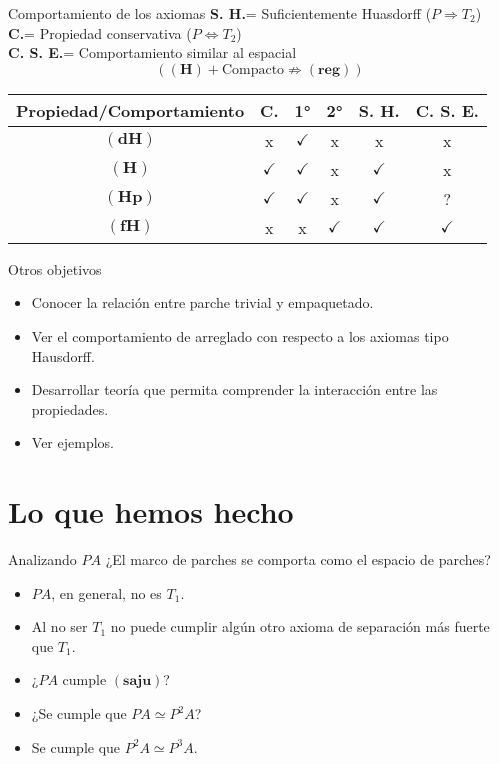 \documentclass[compress,12pt]{beamer}
\begin{document}
\begin{frame}{Comportamiento de los axiomas}
\textbf{S. H.}= Suficientemente Huasdorff ($P\Rightarrow T_2$)\\
\textbf{C.}= Propiedad conservativa ($P\Leftrightarrow T_2$)\\
\textbf{C. S. E.}= Comportamiento similar al espacial
\[
(\mathbf{(H)}+\mbox{Compacto}\nRightarrow \mathbf{(reg)})
\]
\begin{center}
\begin{tabular}{| c | c | c | c | c | c |}
\hline
 Propiedad/Comportamiento & \textbf{C.} & 1° & 2° & \textbf{S. H.} & \textbf{C. S. E.}\\ \hline
$\mathbf{(dH)}$ & x & $\checkmark$ & x & x & x \\ \hline
$\mathbf{(H)}$ & $\checkmark$ & $\checkmark$ & x & $\checkmark$ & x \\ \hline
$\mathbf{(Hp)}$ & $\checkmark$ & $\checkmark$ & x & $\checkmark$ & ? \\ \hline
$\mathbf{(fH)}$ & x & x &  $\checkmark$ & $\checkmark$ & $\checkmark$ \\ \hline
\end{tabular}
\end{center}

\end{frame}

\begin{frame}{Otros objetivos}
    \begin{itemize}
        \item Conocer la relación entre parche trivial y empaquetado.
        \item<2-> Ver el comportamiento de arreglado con respecto a los axiomas tipo Hausdorff.
        \item<3-> Desarrollar teoría que permita comprender la interacción entre las propiedades.
        \item<4-> Ver ejemplos.
    \end{itemize}
\end{frame}

\section{Lo que hemos hecho}
\begin{frame}{Analizando $PA$}
¿El marco de parches se comporta como el espacio de parches?
\begin{itemize}
	\item<2-> $PA$, en general, no es  $T_1$.
	\item<3-> Al no ser $T_1$ no puede cumplir algún otro axioma de separación más fuerte que $T_1$.
	\item<4-> ¿$PA$ cumple $\mathbf{(saju)}$?
	\item<5-> ¿Se cumple que $PA\simeq P^2A$?
	\item<6-> Se cumple que $P^2A\simeq P^3A$.
\end{itemize}
\end{frame}
\end{document}
